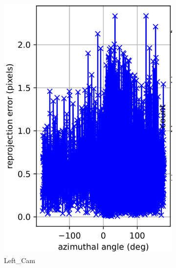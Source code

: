 \documentclass{article}
\begin{document}
\begin{figure}
\begin{subfigure}[b]{0.3\textwidth}
         \includegraphics[width=\textwidth]{cam0az.png}
         \caption{Left\_Cam}
     \end{subfigure}
     \hfill
     \begin{subfigure}[b]{0.3\textwidth}
         \centering

\end{subfigure}
\end{figure}
\end{document}
